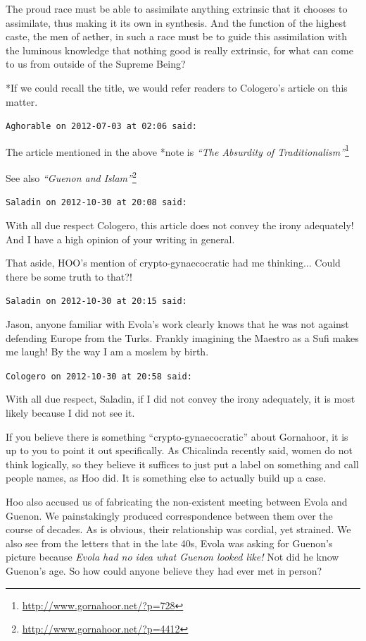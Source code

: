 \begin{footnotesize}
\begin{sffamily}
The proud race must be able to assimilate anything extrinsic that it chooses to assimilate, thus making it its own in synthesis. And the function of the highest caste, the men of aether, in such a race must be to guide this assimilation with the luminous knowledge that nothing good is really extrinsic, for what can come to us from outside of the Supreme Being?

*If we could recall the title, we would refer readers to Cologero's article on this matter.

\hfill

\texttt{Aghorable on 2012-07-03 at 02:06 said:}

The article mentioned in the above *note is \textit{``The Absurdity of
Traditionalism''}\footnote{\url{http://www.gornahoor.net/?p=728}}

See also \textit{``Guenon and Islam''}\footnote{\url{http://www.gornahoor.net/?p=4412}}

\hfill

\texttt{Saladin on 2012-10-30 at 20:08 said:}

With all due respect Cologero, this article does not convey the irony adequately! And I have a high opinion of your writing in general.

That aside, HOO's mention of crypto-gynaecocratic had me thinking... Could there be some truth to that?!

\hfill

\texttt{Saladin on 2012-10-30 at 20:15 said:}

Jason, anyone familiar with Evola's work clearly knows that he was not against defending Europe from the Turks. Frankly imagining the Maestro as a Sufi makes me laugh! By the way I am a moslem by birth.

\hfill

\texttt{Cologero on 2012-10-30 at 20:58 said:}

With all due respect, Saladin, if I did not convey the irony adequately, it is most likely because I did not see it.

If you believe there is something ``crypto-gynaecocratic'' about Gornahoor, it is up to you to point it out specifically. As Chicalinda recently said, women do not think logically, so they believe it suffices to just put a label on something and call people names, as Hoo did. It is something else to actually build up a case.

Hoo also accused us of fabricating the non-existent meeting between Evola and Guenon. We painstakingly produced correspondence between them over the course of decades. As is obvious, their relationship was cordial, yet strained. We also see from the letters that in the late 40s, Evola was asking for Guenon's picture because \emph{Evola had no idea what Guenon looked like!} Not did he know Guenon's age. So how could anyone believe they had ever met in person?


\end{sffamily}
\end{footnotesize}
